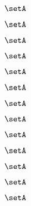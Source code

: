\begin{forslides}
    \begin{equation}
        \label{eq:slides-translation-77}
        \setA
    \end{equation}

    \begin{equation}
        \label{eq:slides-translation-78}
        \setA
    \end{equation}

    \begin{equation}
        \label{eq:slides-translation-79}
        \setA
    \end{equation}
    
    \begin{equation}
        \label{eq:slides-translation-80}
        \setA
    \end{equation}

    \begin{equation}
        \label{eq:slides-translation-81}
        \setA
    \end{equation}

    \begin{equation}
        \label{eq:slides-translation-82}
        \setA
    \end{equation}

    \begin{equation}
        \label{eq:slides-translation-83}
        \setA
    \end{equation}

    \begin{equation}
        \label{eq:slides-translation-84}
        \setA
    \end{equation}

    \begin{equation}
        \label{eq:slides-translation-85}
        \setA
    \end{equation}

    \begin{equation}
        \label{eq:slides-translation-86}
        \setA
    \end{equation}

    \begin{equation}
        \label{eq:slides-translation-87}
        \setA
    \end{equation}

    \begin{equation}
        \label{eq:slides-translation-88}
        \setA
    \end{equation}

    \begin{equation}
        \label{eq:slides-translation-89}
        \setA
    \end{equation}
    

\end{forslides}
